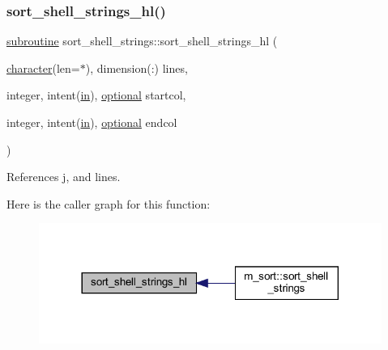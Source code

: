 \subsubsection{\texorpdfstring{sort\+\_\+shell\+\_\+strings\+\_\+hl()}{sort\_shell\_strings\_hl()}}
{\footnotesize\ttfamily \hyperlink{M__stopwatch_83_8txt_acfbcff50169d691ff02d4a123ed70482}{subroutine} sort\+\_\+shell\+\_\+strings\+::sort\+\_\+shell\+\_\+strings\+\_\+hl (\begin{DoxyParamCaption}\item[{\hyperlink{option__stopwatch_83_8txt_abd4b21fbbd175834027b5224bfe97e66}{character}(len=$\ast$), dimension(\+:)}]{lines,  }\item[{integer, intent(\hyperlink{M__journal_83_8txt_afce72651d1eed785a2132bee863b2f38}{in}), \hyperlink{option__stopwatch_83_8txt_aa4ece75e7acf58a4843f70fe18c3ade5}{optional}}]{startcol,  }\item[{integer, intent(\hyperlink{M__journal_83_8txt_afce72651d1eed785a2132bee863b2f38}{in}), \hyperlink{option__stopwatch_83_8txt_aa4ece75e7acf58a4843f70fe18c3ade5}{optional}}]{endcol }\end{DoxyParamCaption})\hspace{0.3cm}{\ttfamily [private]}}



References j, and lines.

Here is the caller graph for this function\+:
\nopagebreak
\begin{figure}[H]
\begin{center}
\leavevmode
\includegraphics[width=317pt]{M__sort_8f90_a16bd54666fe44ae00984394bdeb454b1_icgraph}
\end{center}
\end{figure}
\mbox{\label{M__sort_8f90_a4a1eed2e76f3429d7eb5cd2ae5b50fa1}} 

